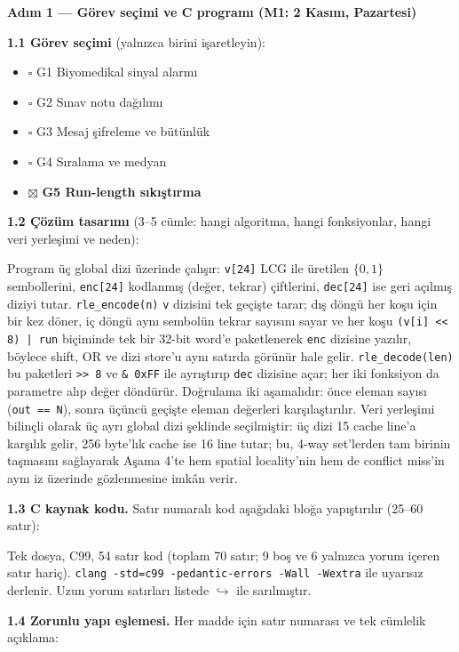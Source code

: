 \documentclass[11pt,a4paper]{article}
\newcommand{\tl}{\texttt}
\begin{document}
\textbf{Adım 1 --- Görev seçimi ve C programı (M1: 2 Kasım, Pazartesi)}

\textbf{1.1 Görev seçimi} (yalnızca birini işaretleyin):

\begin{itemize}[leftmargin=2em,itemsep=1pt,topsep=2pt]
\item $\square$ G1 Biyomedikal sinyal alarmı
\item $\square$ G2 Sınav notu dağılımı
\item $\square$ G3 Mesaj şifreleme ve bütünlük
\item $\square$ G4 Sıralama ve medyan
\item $\boxtimes$ \textbf{G5 Run-length sıkıştırma}
\end{itemize}

\textbf{1.2 Çözüm tasarımı} (3--5 cümle: hangi algoritma, hangi fonksiyonlar, hangi veri yerleşimi
ve neden):

Program üç global dizi üzerinde çalışır: \tl{v[24]} LCG ile üretilen $\{0,1\}$ sembollerini,
\tl{enc[24]} kodlanmış (değer, tekrar) çiftlerini, \tl{dec[24]} ise geri açılmış diziyi tutar.
\tl{rle\_encode(n)} \tl{v} dizisini tek geçişte tarar; dış döngü her koşu için bir kez döner, iç
döngü aynı sembolün tekrar sayısını sayar ve her koşu \tl{(v[i] << 8) | run} biçiminde tek bir
32-bit word'e paketlenerek \tl{enc} dizisine yazılır, böylece shift, OR ve dizi store'u aynı
satırda görünür hale gelir. \tl{rle\_decode(len)} bu paketleri \tl{>> 8} ve \tl{\& 0xFF} ile
ayrıştırıp \tl{dec} dizisine açar; her iki fonksiyon da parametre alıp değer döndürür. Doğrulama
iki aşamalıdır: önce eleman sayısı (\tl{out == N}), sonra üçüncü geçişte eleman değerleri
karşılaştırılır. Veri yerleşimi bilinçli olarak üç ayrı global dizi şeklinde seçilmiştir: üç dizi
15 cache line'a karşılık gelir, 256 byte'lık cache ise 16 line tutar; bu, 4-way set'lerden tam
birinin taşmasını sağlayarak Aşama 4'te hem spatial locality'nin hem de conflict miss'in aynı iz
üzerinde gözlenmesine imkân verir.

\textbf{1.3 C kaynak kodu.} Satır numaralı kod aşağıdaki bloğa yapıştırılır (25--60 satır):



Tek dosya, C99, 54 satır kod (toplam 70 satır; 9 boş ve 6 yalnızca yorum içeren satır hariç).
\tl{clang -std=c99 -pedantic-errors -Wall -Wextra} ile uyarısız derlenir. Uzun yorum satırları
listede $\hookrightarrow$ ile sarılmıştır.

\textbf{1.4 Zorunlu yapı eşlemesi.} Her madde için satır numarası ve tek cümlelik açıklama:
\end{document}
